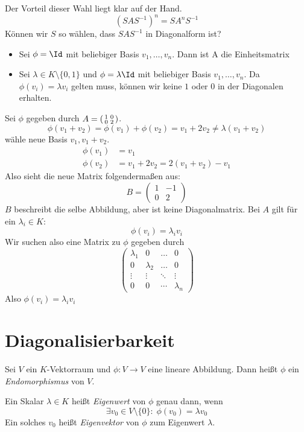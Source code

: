 \documentclass{mycourse}
\newenvironment{psmallmatrix}{\left(\begin{smallmatrix}}{\end{smallmatrix}\right)}
\begin{document}
Der Vorteil dieser Wahl liegt klar auf der Hand.
\[
(SAS^{-1})^n = SA^nS^{-1}
\]
Können wir $S$ so wählen, dass $SAS^{-1}$ in Diagonalform ist?
\begin{ex}
\begin{itemize}
\item Sei $\phi=\Id$ mit beliebiger Basis $v_1,\dotsc,v_n$.
Dann ist A die Einheitsmatrix
\item Sei $\lambda\in K\setminus\{0, 1\}$ und $\phi=\lambda\Id$ mit beliebiger Basis $v_1,\dotsc,v_n$.
Da $\phi(v_i)=\lambda v_i$ gelten muss, können wir keine $1$ oder $0$ in der Diagonalen erhalten.
\end{itemize}
\end{ex}
Sei $\phi$ gegeben durch $A=\begin{psmallmatrix}1&0\\0&2\end{psmallmatrix}$.
\[
\phi(v_1+v_2)=\phi(v_1)+\phi(v_2)=v_1+2v_2\neq\lambda(v_1+v_2)
\]
wähle neue Basis $v_1,v_1+v_2$.
\begin{align*}
\phi(v_1)&=v_1 \\
\phi(v_2)&=v_1+2v_2=2(v_1+v_2)-v_1
\end{align*}
Also sieht die neue Matrix folgendermaßen aus:
\[
B=\begin{pmatrix}1&-1\\0&2\end{pmatrix}
\]
$B$ beschreibt die selbe Abbildung, aber ist keine Diagonalmatrix.
Bei $A$ gilt für ein $\lambda_i\in K$:
\[
\phi(v_i)=\lambda_i v_i
\]
Wir suchen also eine Matrix zu $\phi$ gegeben durch
\[
\begin{pmatrix}\lambda_1&0&\dotsc&0\\0&\lambda_2&\dotsc&0\\\vdots&\vdots&\ddots&\vdots\\0&0&\cdots&\lambda_n\end{pmatrix}
\]
Also $\phi(v_i)=\lambda_i v_i$

\section{Diagonalisierbarkeit}

\begin{df}
\label{df:10.1}
Sei $V$ ein $K$-Vektorraum und $\phi:V\to V$ eine lineare Abbildung.
Dann heißt $\phi$ ein \emph{Endomorphismus} von $V$.

Ein Skalar $\lambda\in K$ heißt \emph{Eigenwert} von $\phi$ genau dann, wenn
\[
\exists v_0\in V\setminus\{0\}:\; \phi(v_0)=\lambda v_0
\]
Ein solches $v_0$ heißt \emph{Eigenvektor} von $\phi$ zum Eigenwert $\lambda$.
\end{df}
\end{document}
